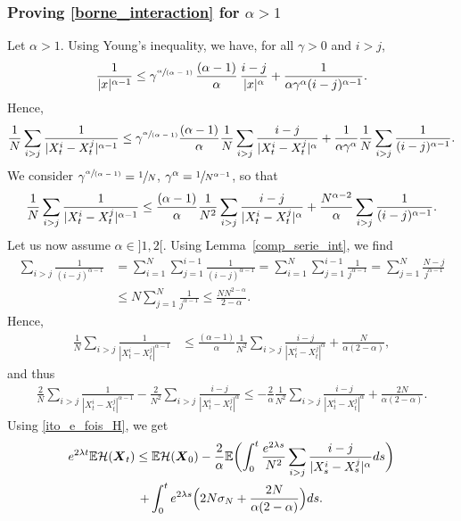 \documentclass[JEP,XML,SOM,Unicode,published]{cedram}
\newcommand{\spfrac}[2]{\sfrac{#1}{(#2)}}
\newcommand{\bX}{{\boldsymbol{X}}}
\theoremstyle{plain}
\theoremstyle{definition}
\begin{document}
\subsubsection*{Proving \eqref{borne_interaction} for $\alpha>1$} Let $\alpha>1$. Using Young's inequality, we have, for all $\gamma>0$ and $i>j$,
\begin{align*}
\frac{1}{|x|^{\alpha-1}}\leq\gamma^{\spfrac{\alpha}{\alpha-1}}\,\frac{(\alpha-1)}{\alpha}\,\frac{i-j}{|x|^{\alpha}}+\frac{1}{\alpha\gamma^\alpha(i-j)^{\alpha-1}}.
\end{align*}
Hence,
\begin{align*}
\frac{1}{N}\sum_{i>j}\frac{1}{|X^i_t-X^j_t|^{\alpha-1}}\leq \gamma^{\spfrac{\alpha}{\alpha-1}}\frac{(\alpha-1)}{\alpha}\frac{1}{N}\sum_{i>j}\frac{i-j}{|X^i_t-X^j_t|^{\alpha}}+\frac{1}{\alpha\gamma^\alpha}\frac{1}{N}\sum_{i>j}\frac{1}{(i-j)^{\alpha-1}}.
\end{align*}
We consider $\gamma^{\spfrac{\alpha}{\alpha-1}}=\sfrac{1}{N}$, \ie $\gamma^{\alpha}=\sfrac{1}{N^{\alpha-1}}$, so that
\begin{equation}\label{controle_serie}
\frac{1}{N}\sum_{i>j}\frac{1}{|X^i_t-X^j_t|^{\alpha-1}}\leq\frac{(\alpha-1)}{\alpha}\frac{1}{N^2}\sum_{i>j}\frac{i-j}{|X^i_t-X^j_t|^{\alpha}}+\frac{N^{\alpha-2}}{\alpha}\sum_{i>j}\frac{1}{(i-j)^{\alpha-1}}.\\
\end{equation}
Let us now assume $\alpha\in{}]1,2[$. Using Lemma~\ref{comp_serie_int}, we find
\begin{align*}
\sum_{i>j}\frac{1}{(i-j)^{\alpha-1}}&=\sum_{i=1}^N\sum_{j=1}^{i-1}\frac{1}{(i-j)^{\alpha-1}}=\sum_{i=1}^N\sum_{j=1}^{i-1}\frac{1}{j^{\alpha-1}}=\sum_{j=1}^N\frac{N-j}{j^{\alpha-1}}\\
&\leq N\sum_{j=1}^N\frac{1}{j^{\alpha-1}}\leq \frac{NN^{2-\alpha}}{2-\alpha}.
\end{align*}
Hence,
\begin{align*}
\frac{1}{N}\sum_{i>j}\frac{1}{|X^i_t-X^j_t|^{\alpha-1}}&\leq \frac{(\alpha-1)}{\alpha}\frac{1}{N^2}\sum_{i>j}\frac{i-j}{|X^i_t-X^j_t|^{\alpha}}+\frac{N}{\alpha(2-\alpha)},
\end{align*}
and thus
\begin{align*}
\frac{2}{N}\sum_{i>j}\frac{1}{|X^i_t-X^j_t|^{\alpha-1}}-\frac{2}{N^2}\sum_{i>j}\frac{i-j}{|X^i_t-X^j_t|^{\alpha}}\leq -\frac{2}{\alpha}\frac{1}{N^2}\sum_{i>j}\frac{i-j}{|X^i_t-X^j_t|^{\alpha}}+\frac{2N}{\alpha(2-\alpha)}.
\end{align*}
Using \eqref{ito_e_fois_H}, we get
\begin{multline}\label{gronwall_H}
e^{2\lambda t}\mathbb{E}\mathcal{H}(\bX_t)\leq \mathbb{E}\mathcal{H}(\bX_0)-\frac{2}{\alpha}\mathbb{E}\biggl(\int_0^t\frac{e^{2\lambda s}}{N^2}\sum_{i>j}\frac{i-j}{|X^i_s-X^j_s|^{\alpha}}ds\biggr)\\
+\int_0^te^{2\lambda s}\Bigl(2N\sigma_N+\frac{2N}{\alpha(2-\alpha)}\Bigr)ds.
\end{multline}
\end{document}

